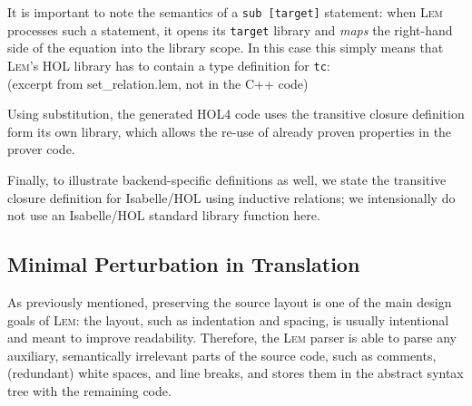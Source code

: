\documentclass[a4paper]{llncs}
\newcommand{\Lem}{\textsc{Lem}}
\begin{document}
\par{}

\noindent It is important to note the semantics of a \verb|sub [target]| statement:
when \Lem{} processes such a statement, it opens its \verb|target| library and
\emph{maps} the right-hand side of the equation into the library scope. In this
case this simply means that \Lem's HOL library has to contain a type definition
for \verb|tc|:\\  
(excerpt from set\_relation.lem, not in the C++ code)

\par{}

\noindent Using substitution, the generated HOL4 code uses the transitive
closure definition form its own library, which allows the re-use of already
proven properties in the prover code.

Finally, to illustrate backend-specific definitions as well, we state the
transitive closure definition for Isabelle/HOL using inductive relations; we
intensionally do not use an Isabelle/HOL standard library function here.

\par{}

\subsection{Minimal Perturbation in Translation}
%
As previously mentioned, preserving the source layout is one of the main design
goals of \Lem{}: the layout, such as indentation and spacing, is usually
intentional and meant to improve readability.  Therefore, the \Lem{} parser is
able to parse any auxiliary, semantically irrelevant parts of the source code,
such as comments, (redundant) white spaces, and line breaks, and stores them in
the abstract syntax tree with the remaining code.
\end{document}
